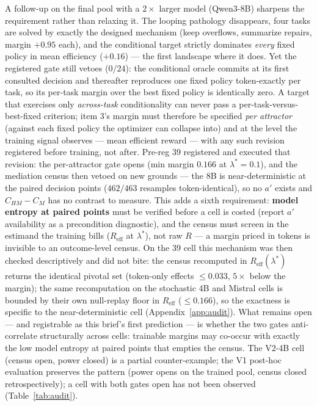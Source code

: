 \documentclass{article}
\theoremstyle{remark}
\begin{document}
A follow-up on the final pool with a $2\times$ larger model (Qwen3-8B)
sharpens the requirement rather than relaxing it. The looping pathology
disappears, four tasks are solved by exactly the designed mechanism
(keep overflows, summarize repairs, margin $+0.95$ each), and the
conditional target strictly dominates \emph{every} fixed policy in mean
efficiency ($+0.16$) --- the first landscape where it does. Yet the
registered gate still vetoes ($0/24$): the conditional oracle commits at
its first consulted decision and thereafter reproduces one fixed policy
token-exactly per task, so its per-task margin over the best fixed policy
is identically zero. A target that exercises only \emph{across-task}
conditionality can never pass a per-task-versus-best-fixed criterion;
item 3's margin must therefore be specified \emph{per attractor} (against
each fixed policy the optimizer can collapse into) and at the level the
training signal observes --- mean efficient reward --- with any such
revision registered before training, not after. Pre-reg 39 registered
and executed that revision: the per-attractor gate opens (min margin
$0.166$ at $\lambda^{*}=0.1$), and the mediation census then vetoed on
new grounds --- the 8B is near-deterministic at the paired decision
points ($462/463$ resamples token-identical), so no $a'$ exists and
$C_{HM}-C_M$ has no contrast to measure. This adds a sixth requirement:
\textbf{model entropy at paired points} must be verified before a cell
is costed (report $a'$ availability as a precondition diagnostic), and
the census must screen in the estimand the training bills
($R_{\text{eff}}$ at $\lambda^{*}$), not raw $R$ --- a margin priced in
tokens is invisible to an outcome-level census. On the 39 cell this
mechanism was then checked descriptively and did not bite: the census
recomputed in $R_{\text{eff}}(\lambda^{*})$ returns the identical
pivotal set (token-only effects $\leq 0.033$, $5\times$ below the
margin); the same recomputation on the stochastic 4B and Mistral cells
is bounded by their own null-replay floor in $R_{\text{eff}}$ ($\leq
0.166$), so the exactness is specific to the near-deterministic cell
(Appendix~\ref{app:audit}). What remains open --- and registrable as this brief's first
prediction --- is whether the two gates anti-correlate structurally
across cells: trainable margins may co-occur with exactly the low model
entropy at paired points that empties the census. The V2-4B cell
(census open, power closed) is a partial counter-example; the V1
post-hoc evaluation preserves the pattern (power opens on the trained
pool, census closed retrospectively); a cell with both gates open has
not been observed (Table~\ref{tab:audit}).
\end{document}

